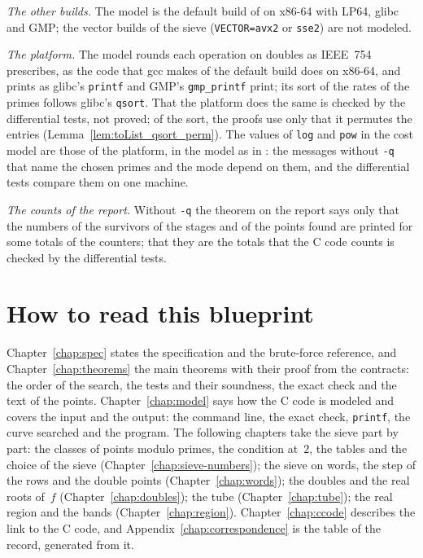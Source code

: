\emph{The other builds.} The model is the default build of \jpoints{} on x86-64 with LP64, glibc and
GMP; the vector builds of the sieve (\verb|VECTOR=avx2| or \verb|sse2|) are not modeled.

\emph{The platform.} The model rounds each operation on doubles as IEEE~754 prescribes, as the code
that gcc makes of the default build does on x86-64, and prints as glibc's \texttt{printf} and GMP's
\texttt{gmp\_printf} print; its sort of the rates of the primes follows glibc's \texttt{qsort}. That
the platform does the same is checked by the differential tests, not proved; of the sort, the proofs
use only that it permutes the entries (Lemma~\ref{lem:toList_qsort_perm}). The values of
\texttt{log} and \texttt{pow} in the cost model are those of the platform, in the model as in
\jpoints{}: the messages without \verb|-q| that name the chosen primes and the mode depend on them,
and the differential tests compare them on one machine.

\emph{The counts of the report.} Without \verb|-q| the theorem on the report says only that the
numbers of the survivors of the stages and of the points found are printed for some totals of the
counters; that they are the totals that the C code counts is checked by the differential tests.

\section{How to read this blueprint}\label{sec:overviewReading}

Chapter~\ref{chap:spec} states the specification and the brute-force reference, and
Chapter~\ref{chap:theorems} the main theorems with their proof from the contracts: the order of the
search, the tests and their soundness, the exact check and the text of the points.
Chapter~\ref{chap:model} says how the C code is modeled and covers the input and the output: the
command line, the exact check, \texttt{printf}, the curve searched and the program. The following
chapters take the sieve part by part: the classes of points modulo primes, the condition at~$2$, the
tables and the choice of the sieve (Chapter~\ref{chap:sieve-numbers}); the sieve on words, the step
of the rows and the double points (Chapter~\ref{chap:words}); the doubles and the real roots of~$f$
(Chapter~\ref{chap:doubles}); the tube (Chapter~\ref{chap:tube}); the real region and the bands
(Chapter~\ref{chap:region}). Chapter~\ref{chap:ccode} describes the link to the C code, and
Appendix~\ref{chap:correspondence} is the table of the record, generated from it.

